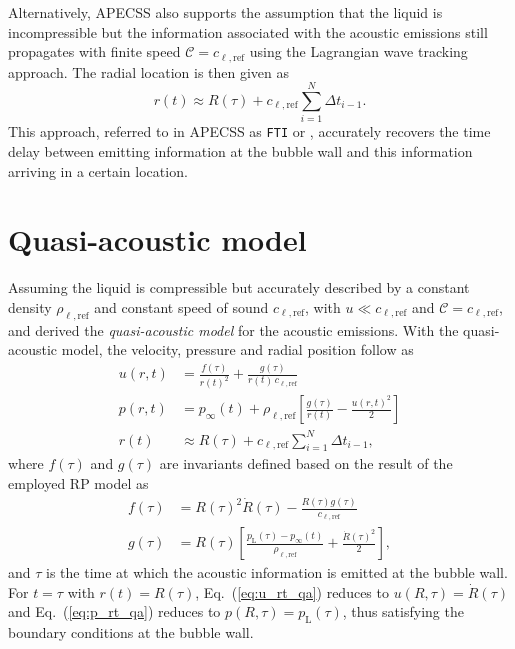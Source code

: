 Alternatively, APECSS also supports the assumption that the liquid is incompressible but the information associated with the acoustic emissions still propagates with finite speed $\mathcal{C} = c_{\ell,\mathrm{ref}}$ using the Lagrangian wave tracking approach. 
The radial location is then given as
\begin{equation}
    r(t) \approx R(\tau) + c_{\ell,\mathrm{ref}} \sum_{i=1}^N \Delta t_{i-1}. \label{eq:r_t_fti}
\end{equation}
This approach, referred to in APECSS as {\tt FTI} or , accurately recovers the time delay between emitting information at the bubble wall and this information arriving in a certain location.

\section{Quasi-acoustic model}
\label{sec:emissionsqa}

Assuming the liquid is compressible but accurately described by a constant density $\rho_{\ell,\mathrm{ref}}$ and constant speed of sound $c_{\ell,\mathrm{ref}}$, with $u \ll c_{\ell,\mathrm{ref}}$ and $\mathcal{C} = c_{\ell,\mathrm{ref}}$, \citet{Trilling1952} and \citet{Gilmore1952} derived the {\it quasi-acoustic model} for the acoustic emissions. With the quasi-acoustic model, the velocity, pressure and radial position follow as
\begin{align}
    u(r,t) &= \frac{f(\tau)}{r(t)^2} + \frac{g(\tau)}{r(t) \, c_{\ell,\mathrm{ref}}}  \label{eq:u_rt_qa} \\
  p(r,t) &=  p_\infty(t) + \rho_{\ell,\mathrm{ref}} \left[ \frac{g(\tau)}{r(t)} - \frac{u(r,t)^2}{2} \right] \label{eq:p_rt_qa} \\
  r(t) &\approx R(\tau) + c_{\ell,\mathrm{ref}} \sum_{i=1}^N \Delta t_{i-1}, \label{eq:r_t_qa}
\end{align}
where $f(\tau)$ and $g(\tau)$ are invariants defined based on the result of the employed RP model as
\begin{align}
    f(\tau) &= R(\tau)^2 \dot{R}(\tau) - \frac{R(\tau) g(\tau)}{c_{\ell,\mathrm{ref}}}\\
    g(\tau) &= R(\tau) \left[\frac{p_\mathrm{L}(\tau)-p_\infty(t)}{\rho_{\ell,\mathrm{ref}}} + \frac{\dot{R}(\tau)^2}{2} \right],
\end{align}
and $\tau$ is the time at which the acoustic information is emitted at the bubble wall. For $t=\tau$ with $r(t)=R(\tau)$, Eq.~(\ref{eq:u_rt_qa}) reduces to $u(R,\tau)=\dot{R}(\tau)$ and Eq.~(\ref{eq:p_rt_qa}) reduces to $p(R,\tau)=p_\mathrm{L}(\tau)$, thus satisfying the boundary conditions at the bubble wall. 

